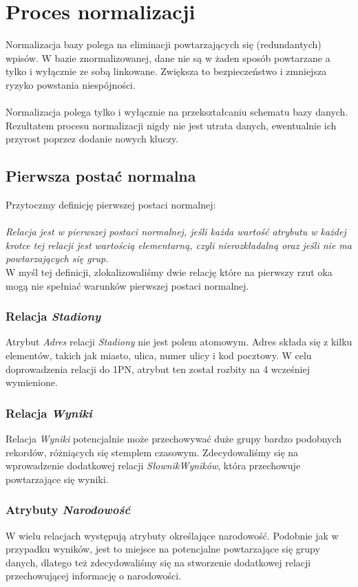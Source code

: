\documentclass{mwrep}
\begin{document}
\section{Proces normalizacji}
Normalizacja bazy polega na eliminacji powtarzających się (redundantych) wpisów. W bazie 
znormalizowanej, dane nie są w żaden sposób powtarzane a tylko i wyłącznie ze sobą linkowane. 
Zwiększa to bezpieczeństwo i zmniejsza ryzyko powstania niespójności. \\
\\
\indent Normalizacja polega tylko i wyłącznie na przekształcaniu schematu bazy danych. Rezultatem
procesu normalizacji nigdy nie jest utrata danych, ewentualnie ich przyrost poprzez dodanie nowych
kluczy\cite{Kowalczyk1}.

\subsection{Pierwsza postać normalna}
Przytoczmy definicję pierwszej postaci normalnej: \\
\\
\emph{Relacja jest w pierwszej postaci normalnej, jeśli każda wartość atrybutu
w każdej krotce tej relacji jest wartością elementarną, czyli
nierozkładalną oraz jeśli nie ma powtarzających się grup\cite{Kowalczyk1}.}\\

W myśl tej definicji, zlokalizowaliśmy dwie relację które na pierwszy rzut oka mogą nie spełniać 
warunków pierwszej postaci normalnej. 

\subsubsection{Relacja \emph{Stadiony}}
Atrybut \emph{Adres} relacji \emph{Stadiony} nie jest polem atomowym. Adres składa się z kilku elementów, takich jak
miasto, ulica, numer ulicy i kod pocztowy. W celu doprowadzenia relacji do 1PN, atrybut ten został rozbity na 4 wcześniej
wymienione.

\subsubsection{Relacja \emph{Wyniki}}
Relacja \emph{Wyniki} potencjalnie może przechowywać duże grupy bardzo podobnych rekordów, różniących się 
stemplem czasowym. Zdecydowaliśmy się na wprowadzenie dodatkowej relacji \emph{SłownikWyników}, która przechowuje powtarzające się
wyniki.

\subsubsection{Atrybuty \emph{Narodowość}}
W wielu relacjach występują atrybuty określające narodowość. Podobnie jak w przypadku wyników, jest to miejsce na potencjalne
powtarzające się grupy danych, dlatego też zdecydowaliśmy się na stworzenie dodatkowej relacji przechowującej informację o narodowości.
\end{document}

